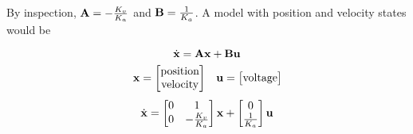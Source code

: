 By inspection, $\mathbf{A} = -\frac{K_v}{K_a}$ and $\mathbf{B} = \frac{1}{K_a}$. A
model with position and velocity states would be
\begin{theorem}
  \begin{equation*}
    \dot{\mathbf{x}} = \mathbf{A}\mathbf{x} + \mathbf{B}\mathbf{u}
  \end{equation*}
  \begin{equation*}
    \begin{array}{cc}
    \mathbf{x} =
      \begin{bmatrix}
        \text{position} \\
        \text{velocity}
      \end{bmatrix} &
    \mathbf{u} =
      \begin{bmatrix}
        \text{voltage}
      \end{bmatrix}
    \end{array}
  \end{equation*}
  \begin{equation}
    \dot{\mathbf{x}} =
      \begin{bmatrix}
        0 & 1 \\
        0 & -\frac{K_v}{K_a}
      \end{bmatrix}
      \mathbf{x} +
      \begin{bmatrix}
        0 \\
        \frac{1}{K_a}
      \end{bmatrix}
      \mathbf{u}
  \end{equation}
\end{theorem}
